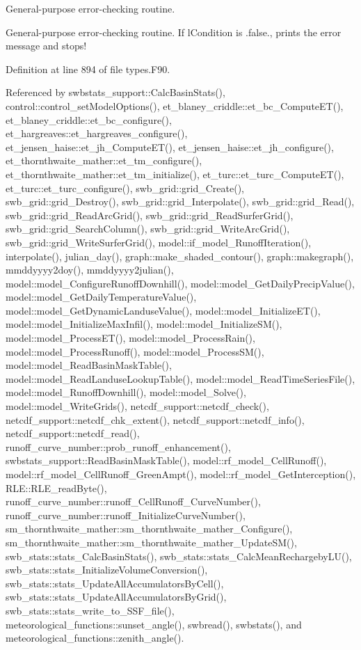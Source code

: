General-\/purpose error-\/checking routine. 

General-\/purpose error-\/checking routine. If lCondition is .false., prints the error message and stops! 

Definition at line 894 of file types.F90.



Referenced by swbstats\_\-support::CalcBasinStats(), control::control\_\-setModelOptions(), et\_\-blaney\_\-criddle::et\_\-bc\_\-ComputeET(), et\_\-blaney\_\-criddle::et\_\-bc\_\-configure(), et\_\-hargreaves::et\_\-hargreaves\_\-configure(), et\_\-jensen\_\-haise::et\_\-jh\_\-ComputeET(), et\_\-jensen\_\-haise::et\_\-jh\_\-configure(), et\_\-thornthwaite\_\-mather::et\_\-tm\_\-configure(), et\_\-thornthwaite\_\-mather::et\_\-tm\_\-initialize(), et\_\-turc::et\_\-turc\_\-ComputeET(), et\_\-turc::et\_\-turc\_\-configure(), swb\_\-grid::grid\_\-Create(), swb\_\-grid::grid\_\-Destroy(), swb\_\-grid::grid\_\-Interpolate(), swb\_\-grid::grid\_\-Read(), swb\_\-grid::grid\_\-ReadArcGrid(), swb\_\-grid::grid\_\-ReadSurferGrid(), swb\_\-grid::grid\_\-SearchColumn(), swb\_\-grid::grid\_\-WriteArcGrid(), swb\_\-grid::grid\_\-WriteSurferGrid(), model::if\_\-model\_\-RunoffIteration(), interpolate(), julian\_\-day(), graph::make\_\-shaded\_\-contour(), graph::makegraph(), mmddyyyy2doy(), mmddyyyy2julian(), model::model\_\-ConfigureRunoffDownhill(), model::model\_\-GetDailyPrecipValue(), model::model\_\-GetDailyTemperatureValue(), model::model\_\-GetDynamicLanduseValue(), model::model\_\-InitializeET(), model::model\_\-InitializeMaxInfil(), model::model\_\-InitializeSM(), model::model\_\-ProcessET(), model::model\_\-ProcessRain(), model::model\_\-ProcessRunoff(), model::model\_\-ProcessSM(), model::model\_\-ReadBasinMaskTable(), model::model\_\-ReadLanduseLookupTable(), model::model\_\-ReadTimeSeriesFile(), model::model\_\-RunoffDownhill(), model::model\_\-Solve(), model::model\_\-WriteGrids(), netcdf\_\-support::netcdf\_\-check(), netcdf\_\-support::netcdf\_\-chk\_\-extent(), netcdf\_\-support::netcdf\_\-info(), netcdf\_\-support::netcdf\_\-read(), runoff\_\-curve\_\-number::prob\_\-runoff\_\-enhancement(), swbstats\_\-support::ReadBasinMaskTable(), model::rf\_\-model\_\-CellRunoff(), model::rf\_\-model\_\-CellRunoff\_\-GreenAmpt(), model::rf\_\-model\_\-GetInterception(), RLE::RLE\_\-readByte(), runoff\_\-curve\_\-number::runoff\_\-CellRunoff\_\-CurveNumber(), runoff\_\-curve\_\-number::runoff\_\-InitializeCurveNumber(), sm\_\-thornthwaite\_\-mather::sm\_\-thornthwaite\_\-mather\_\-Configure(), sm\_\-thornthwaite\_\-mather::sm\_\-thornthwaite\_\-mather\_\-UpdateSM(), swb\_\-stats::stats\_\-CalcBasinStats(), swb\_\-stats::stats\_\-CalcMeanRechargebyLU(), swb\_\-stats::stats\_\-InitializeVolumeConversion(), swb\_\-stats::stats\_\-UpdateAllAccumulatorsByCell(), swb\_\-stats::stats\_\-UpdateAllAccumulatorsByGrid(), swb\_\-stats::stats\_\-write\_\-to\_\-SSF\_\-file(), meteorological\_\-functions::sunset\_\-angle(), swbread(), swbstats(), and meteorological\_\-functions::zenith\_\-angle().

